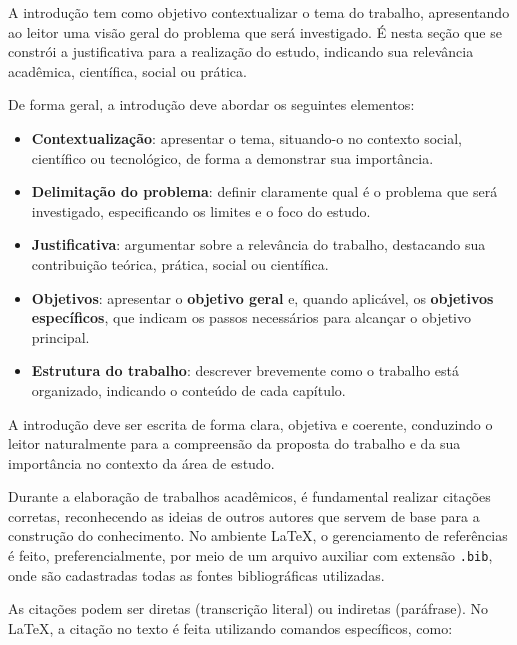 
A introdução tem como objetivo contextualizar o tema do trabalho, apresentando ao leitor uma visão geral do problema que será investigado. É nesta seção que se constrói a justificativa para a realização do estudo, indicando sua relevância acadêmica, científica, social ou prática.

De forma geral, a introdução deve abordar os seguintes elementos:

\begin{itemize}
    \item \textbf{Contextualização}: apresentar o tema, situando-o no contexto social, científico ou tecnológico, de forma a demonstrar sua importância.
    
    \item \textbf{Delimitação do problema}: definir claramente qual é o problema que será investigado, especificando os limites e o foco do estudo.
    
    \item \textbf{Justificativa}: argumentar sobre a relevância do trabalho, destacando sua contribuição teórica, prática, social ou científica.
    
    \item \textbf{Objetivos}: apresentar o \textbf{objetivo geral} e, quando aplicável, os \textbf{objetivos específicos}, que indicam os passos necessários para alcançar o objetivo principal.
    
    \item \textbf{Estrutura do trabalho}: descrever brevemente como o trabalho está organizado, indicando o conteúdo de cada capítulo.
\end{itemize}

A introdução deve ser escrita de forma clara, objetiva e coerente, conduzindo o leitor naturalmente para a compreensão da proposta do trabalho e da sua importância no contexto da área de estudo.



Durante a elaboração de trabalhos acadêmicos, é fundamental realizar citações corretas, reconhecendo as ideias de outros autores que servem de base para a construção do conhecimento. No ambiente \LaTeX, o gerenciamento de referências é feito, preferencialmente, por meio de um arquivo auxiliar com extensão \texttt{.bib}, onde são cadastradas todas as fontes bibliográficas utilizadas.


As citações podem ser diretas (transcrição literal) ou indiretas (paráfrase). No \LaTeX, a citação no texto é feita utilizando comandos específicos, como:

